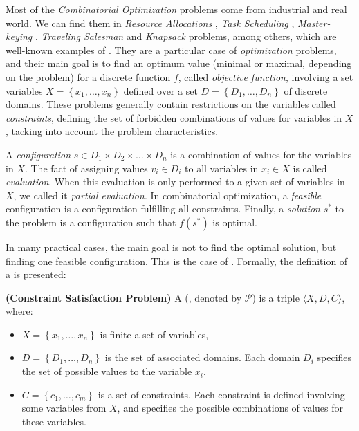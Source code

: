Most of the \textit{Combinatorial Optimization} problems come from industrial and real world. We can find them in {\it Resource Allocations} \cite{Akplogan2011}, \textit{Task Scheduling} \cite{Sibbesen2008}, \textit{Master-keying} \cite{Espelage2000}, \textit{Traveling Salesman} and \textit{Knapsack} problems, among others, which are well-known examples of \cops{} \cite{Smith2005}. They are a particular case of \textit{optimization} problems, and their main goal is to find an optimum value (minimal or maximal, depending on the problem) for a discrete function $f$, called \textit{objective function}, involving a set variables $X = \left\{x_1, \dots, x_n\right\}$ defined over a set $D = \left\{D_1, \dots, D_n\right\}$ of discrete domains. These problems generally contain restrictions on the variables called \textit{constraints}, defining the set of forbidden combinations of values for variables in $X$, tacking into account the problem characteristics.

A \textit{configuration} $s\in D_1\times D_2\times\dots\times D_n$ is a combination of values for the variables in $X$. The fact of assigning values $v_i \in D_i$ to all variables in $x_i \in X$ is called \textit{evaluation}. When this evaluation is only performed to a given set of variables in $X$, we called it \textit{partial evaluation}. In combinatorial optimization, a \textit{feasible} configuration is a configuration fulfilling all constraints. Finally, a \textit{solution} $s^*$ to the problem is a configuration such that $f(s^*)$ is optimal.

In many practical cases, the main goal is not to find the optimal solution, but finding one feasible configuration. This is the case of \CSPs. Formally, the definition of a \csp{} is presented: 

\begin{definition}{\bf (Constraint Satisfaction Problem)}
\label{def:csp}
A \CSP{} (\csp, denoted by $\mathcal{P}$) is a triple $\langle X,D,C \rangle$, where:
\begin{itemize}
\item $X = \left\{x_1,\ldots,x_n\right\}$ is finite a set of variables,
\item $D = \left\{D_1,\ldots, D_n\right\}$ is the set of associated domains. Each domain $D_i$ specifies the set of possible values to the variable $x_i$. %
\item $C = \left\{c_1,\ldots, c_m\right\}$ is a set of constraints. Each constraint is defined involving some variables from $X$, and specifies the possible combinations of values for these variables.
\end{itemize}
\end{definition}

